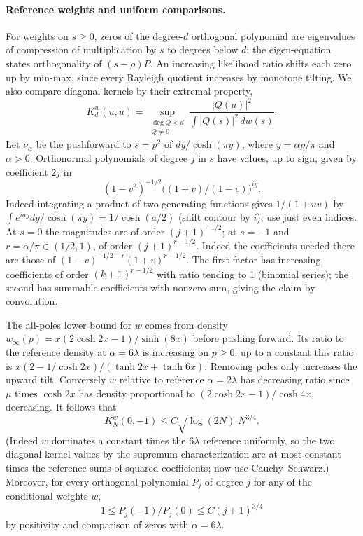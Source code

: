\paragraph{Reference weights and uniform comparisons.}
For weights on \(s\ge0\), zeros of the degree-\(d\) orthogonal polynomial are eigenvalues of compression of multiplication by \(s\) to degrees below \(d\): the eigen-equation states orthogonality of \((s-\rho)P\). An increasing likelihood ratio shifts each zero up by min-max, since every Rayleigh quotient increases by monotone tilting. We also compare diagonal kernels by their extremal property,
\[
 K_d^w(u,u)=\sup_{\substack{\deg Q<d\\Q\ne0}}
 \frac{|Q(u)|^2}{\int|Q(s)|^2\,dw(s)}.
\]
Let \(\nu_\alpha\) be the pushforward to \(s=p^2\) of \(dy/\cosh(\pi y)\), where \(y=\alpha p/\pi\) and \(\alpha>0\). Orthonormal polynomials of degree \(j\) in \(s\) have values, up to sign, given by coefficient \(2j\) in
\[
 (1-v^2)^{-1/2}\big((1+v)/(1-v)\big)^{iy}.
\]
Indeed integrating a product of two generating functions gives \(1/(1+uv)\) by \(\int e^{iay}dy/\cosh(\pi y)=1/\cosh(a/2)\) (shift contour by \(i\)); use just even indices. At \(s=0\) the magnitudes are of order \((j+1)^{-1/2}\); at \(s=-1\) and \(r=\alpha/\pi\in(1/2,1)\), of order \((j+1)^{r-1/2}\). Indeed the coefficients needed there are those of \((1-v)^{-1/2-r}(1+v)^{r-1/2}\). The first factor has increasing coefficients of order \((k+1)^{r-1/2}\) with ratio tending to 1 (binomial series); the second has summable coefficients with nonzero sum, giving the claim by convolution.

The all-poles lower bound for \(w\) comes from density \(w_\infty(p)=x(2\cosh2x-1)/\sinh(8x)\) before pushing forward. Its ratio to the reference density at \(\alpha=6\lambda\) is increasing on \(p\ge0\): up to a constant this ratio is
\(x(2-1/\cosh2x)/(\tanh2x+\tanh6x)\). Removing poles only increases the upward tilt. Conversely \(w\) relative to reference \(\alpha=2\lambda\) has decreasing ratio since \(\mu\) times \(\cosh2x\) has density proportional to \((2\cosh2x-1)/\cosh4x\), decreasing. It follows that
\[
 K_N^w(0,-1)\le C\sqrt{\log(2N)}\ N^{3/4}.
\]
(Indeed \(w\) dominates a constant times the \(6\lambda\) reference uniformly, so the two diagonal kernel values by the supremum characterization are at most constant times the reference sums of squared coefficients; now use Cauchy--Schwarz.)
Moreover, for every orthogonal polynomial \(P_j\) of degree \(j\) for any of the conditional weights \(w\),
\[
 1\le P_j(-1)/P_j(0)\le C(j+1)^{3/4}
\]
by positivity and comparison of zeros with \(\alpha=6\lambda\).

